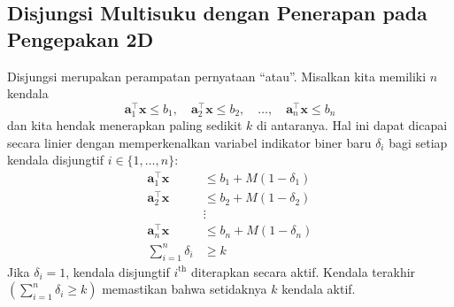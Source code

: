 \subsection{Disjungsi Multisuku dengan Penerapan pada Pengepakan 2D}
\label{subsec:multi-term-disjunction}

Disjungsi merupakan perampatan pernyataan ``atau''. Misalkan kita memiliki $n$ kendala
	$$
	\mathbf{a}_1^\top\mathbf{x} \leq b_1, \quad \mathbf{a}_2^\top\mathbf{x} \leq b_2, \quad\dots, \quad \mathbf{a}_n^\top\mathbf{x} \leq b_n
	$$
dan kita hendak menerapkan paling sedikit $k$ di antaranya. Hal ini dapat dicapai secara linier dengan memperkenalkan variabel indikator biner baru $\delta_i$ bagi setiap kendala disjungtif $i \in \{1,\dots,n\}$:
	\begin{align*}
	\mathbf{a}_1^\top\mathbf{x} &\leq b_1+M(1-\delta_1) \\
	\mathbf{a}_2^\top\mathbf{x} &\leq b_2+M(1-\delta_2) \\
								&\vdots 				\\
	\mathbf{a}_n^\top\mathbf{x} &\leq b_n+M(1-\delta_n) \\
	\sum_{i=1}^n\delta_i &\geq k
	\end{align*}
Jika $\delta_i = 1$, kendala disjungtif $i^\text{th}$ diterapkan secara aktif. Kendala terakhir $\left(\sum_{i=1}^n\delta_i \geq k\right)$ memastikan bahwa setidaknya $k$ kendala aktif.

